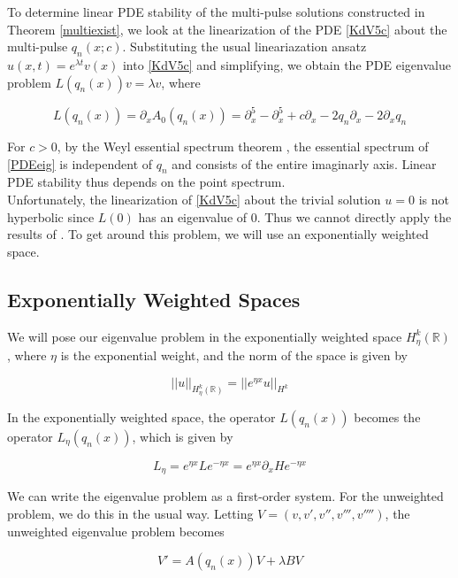 \documentclass[12pt]{article}
\def\R{{\mathbb R}}
\begin{document}
To determine linear PDE stability of the multi-pulse solutions constructed in Theorem \ref{multiexist}, we look at the linearization of the PDE \eqref{KdV5c} about the multi-pulse $q_n(x; c)$. Substituting the usual lineariazation ansatz $u(x, t) = e^{\lambda t} v(x)$ into \eqref{KdV5c} and simplifying, we obtain the PDE eigenvalue problem $L(q_n(x)) v = \lambda v$, where

\begin{equation}\label{PDEeig}
L(q_n(x)) = \partial_x A_0(q_n(x)) = \partial_x^5 - \partial_x^5 + c \partial_x - 2 q_n \partial_x - 2 \partial_x q_n  
\end{equation}

For $c > 0$, by the Weyl essential spectrum theorem \cite[Theorem 2.2.6]{Kapitula2013}, the essential spectrum of \eqref{PDEeig} is independent of $q_n$ and consists of the entire imaginarly axis. Linear PDE stability thus depends on the point spectrum. \\

Unfortunately, the linearization of \eqref{KdV5c} about the trivial solution $u = 0$ is not hyperbolic since $L(0)$ has an eigenvalue of 0. Thus we cannot directly apply the results of \cite{Sandstede1998}. To get around this problem, we will use an exponentially weighted space.

\subsection{Exponentially Weighted Spaces}\label{sec:expwt}

We will pose our eigenvalue problem in the exponentially weighted space $H_\eta^k(\R)$, where $\eta$ is the exponential weight, and the norm of the space is given by

\[
||u||_{H_\eta^k(\R)} = ||e^{\eta x}u||_{H^k}
\]

In the exponentially weighted space, the operator $L(q_n(x))$ becomes the operator $L_\eta(q_n(x))$, which is given by

\begin{equation}\label{Leta}
L_\eta = e^{\eta x} L e^{-\eta x} = e^{\eta x} \partial_x H e^{-\eta x}
\end{equation}

We can write the eigenvalue problem as a first-order system. For the unweighted problem, we do this in the usual way. Letting $V = (v, v', v'', v''', v'''')$, the unweighted eigenvalue problem becomes

\[
V' = A(q_n(x))V + \lambda B V
\]
\end{document}
